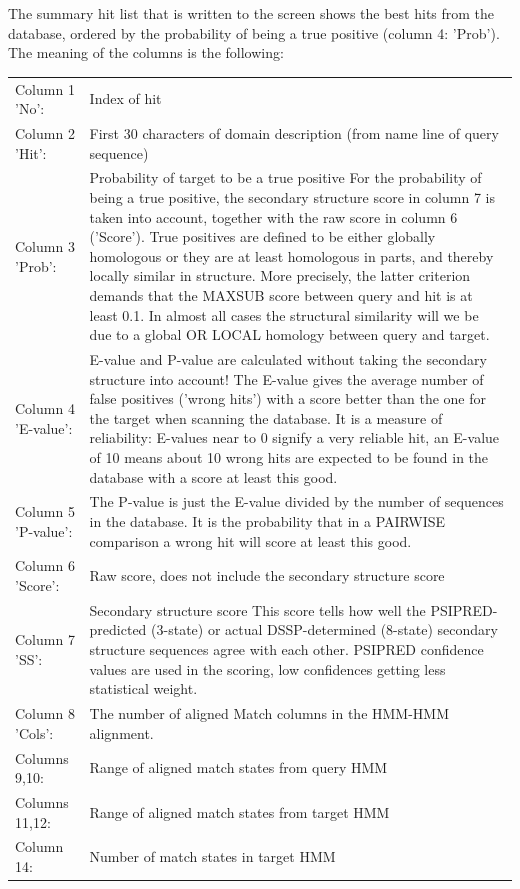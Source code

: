\documentclass[11pt,a4paper]{article}
\begin{document}
The summary hit list that is written to the screen shows the best hits from the 
database, ordered by the probability of being a true positive (column 4: 'Prob'). 
The meaning of the columns is the following:
\vspace{5mm}

\renewcommand{\arraystretch}{1.2}
\begin{longtable}{lp{110mm}}
Column 1 'No': & Index of hit\\

Column 2 'Hit': & First 30 characters of domain description (from name line of query sequence)\\

Column 3 'Prob': & Probability of target to be a true positive
For the probability of being a true positive, the secondary structure score 
in column 7 is taken into account, together with the raw score in column 6 ('Score'). 
True positives are defined to be either globally homologous or they are at least 
homologous in parts, and thereby locally similar in structure. More precisely, 
the latter criterion demands that the MAXSUB score between query and hit is at 
least 0.1. In almost all cases the structural similarity will we be due to a global
OR LOCAL homology between query and target. \\

Column 4 'E-value': & 
E-value and P-value are calculated without taking the secondary structure into account!
The E-value gives the average number of false positives ('wrong hits') with a score 
better than the one for the target when scanning the database. It is a measure of 
reliability: E-values near to 0 signify a very reliable hit, an E-value of 10 means 
about 10 wrong hits are expected to be found in the database with a score at least 
this good.\\

Column 5 'P-value': & 
The P-value is just the E-value divided by the number of sequences in the database.
It is the probability that in a PAIRWISE comparison a wrong hit will score at least 
this good.\\

Column 6 'Score': & Raw score, does not include the secondary structure score\\

Column 7 'SS':    & Secondary structure score
This score tells how well the PSIPRED-predicted (3-state) or actual DSSP-determined 
(8-state) secondary structure sequences agree with each other. PSIPRED confidence 
values are used in the scoring, low confidences getting less statistical weight.\\

Column 8 'Cols': & The number of aligned Match columns in the HMM-HMM alignment.\\

Columns 9,10: &  Range of aligned match states from query HMM\\

Columns 11,12: & Range of aligned match states from target HMM\\
Column 14: & Number of match states in target HMM\\
\end{longtable}
\end{document}
